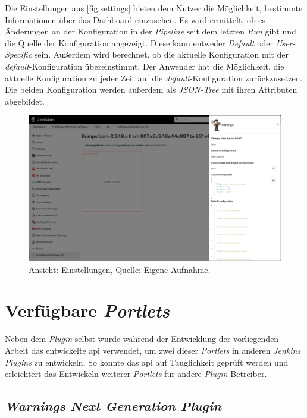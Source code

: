 Die Einstellungen aus \autoref{fig:settings} bieten dem Nutzer die Möglichkeit, bestimmte Informationen über das Dashboard einzusehen. Es wird ermittelt, ob es Änderungen an der Konfiguration in der \textit{Pipeline} seit dem letzten \textit{Run} gibt und die Quelle der Konfiguration angezeigt. Diese kann entweder \textit{Default} oder \textit{User-Specific} sein. Außerdem wird berechnet, ob die aktuelle Konfiguration mit der \textit{default}-Konfiguration übereinstimmt. Der Anwender hat die Möglichkeit, die aktuelle Konfiguration zu jeder Zeit auf die \textit{default}-Konfiguration zurückzusetzen. Die beiden Konfiguration werden außerdem als \textit{JSON-Tree} mit ihren Attributen abgebildet. 

\begin{figure}[h!]
\centering
\includegraphics[width=\textwidth]{source/images/settings}
\caption[Ansicht: Einstellungen.]{Ansicht: Einstellungen, Quelle: Eigene Aufnahme.}
\label{fig:settings}
\end{figure}


\section{Verfügbare \textit{Portlets}}

Neben dem \textit{Plugin} selbst wurde während der Entwicklung der vorliegenden Arbeit das entwickelte \ac{api} verwendet, um zwei dieser \textit{Portlets} in anderen \textit{Jenkins} \textit{Plugins} zu entwickeln. So konnte das \ac{api} auf Tauglichkeit geprüft werden und erleichtert das Entwickeln weiterer \textit{Portlets} für andere \textit{Plugin} Betreiber.

\subsection{\textit{Warnings Next Generation Plugin}}
\label{chap:warnings-ng}

